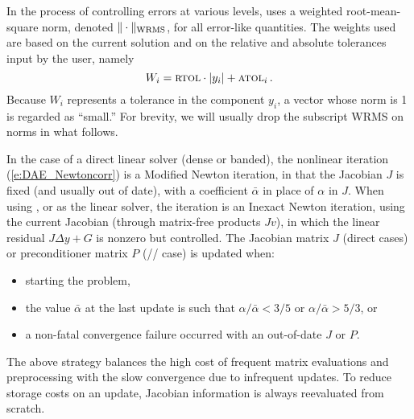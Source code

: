 In the process of controlling errors at various levels, {\ida} uses a
weighted root-mean-square norm, denoted 
$\|\cdot\|_{\mbox{\scriptsize WRMS}}$, for all 
error-like quantities.  The weights used are based on the current
solution and on the relative and absolute tolerances input by the
user, namely
\begin{equation}\label{e:errwt}
 W_i = \mbox{\sc rtol} \cdot |y_i| + \mbox{\sc atol}_i \, .
\end{equation}
Because $W_i$ represents a tolerance in the component $y_i$, a vector
whose norm is 1 is regarded as ``small.''  For brevity, we will
usually drop the subscript WRMS on norms in what follows.

In the case of a direct linear solver (dense or banded), the nonlinear 
iteration (\ref{e:DAE_Newtoncorr}) is a Modified Newton iteration, in
that the Jacobian $J$ is fixed (and usually out of date), with
a coefficient $\bar\alpha$ in place of $\alpha$ in $J$. When using
{\spgmr}, {\spbcg} or {\sptfqmr} as the linear solver, the iteration is an
Inexact Newton iteration, using the current Jacobian (through matrix-free products $Jv$),
in which the linear residual $J\Delta y + G$ is nonzero but controlled.
The Jacobian matrix $J$ (direct cases) or preconditioner matrix $P$ 
({\spgmr}/{\spbcg}/{\sptfqmr} case) is updated when:
\begin{itemize}
\item starting the problem,
\item the value $\bar\alpha$ at the last update is such that
  $\alpha / {\bar\alpha} < 3/5$ or $\alpha / {\bar\alpha} > 5/3$, or
\item a non-fatal convergence failure occurred with an out-of-date $J$ or $P$.
\end{itemize}
The above strategy balances the high cost of frequent matrix evaluations
and preprocessing with the slow convergence due to infrequent updates.
To reduce storage costs on an update, Jacobian information is always
reevaluated from scratch.

